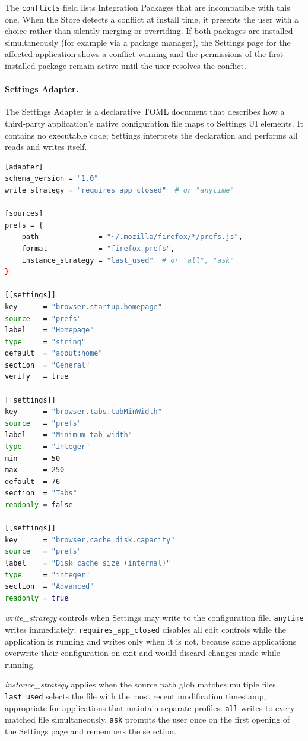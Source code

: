 The \texttt{conflicts} field lists Integration Packages that are incompatible
with this one. When the Store detects a conflict at install time, it presents
the user with a choice rather than silently merging or overriding. If both
packages are installed simultaneously (for example via a package manager), the
Settings page for the affected application shows a conflict warning and the
permissions of the first-installed package remain active until the user
resolves the conflict.

\paragraph{Settings Adapter.}
The Settings Adapter is a declarative TOML document that describes how a
third-party application's native configuration file maps to Settings UI
elements. It contains no executable code; Settings interprets the declaration
and performs all reads and writes itself.

\begin{lstlisting}[language=bash, caption={Settings Adapter declaration}]
[adapter]
schema_version = "1.0"
write_strategy = "requires_app_closed"  # or "anytime"

[sources]
prefs = {
    path              = "~/.mozilla/firefox/*/prefs.js",
    format            = "firefox-prefs",
    instance_strategy = "last_used"  # or "all", "ask"
}

[[settings]]
key      = "browser.startup.homepage"
source   = "prefs"
label    = "Homepage"
type     = "string"
default  = "about:home"
section  = "General"
verify   = true

[[settings]]
key      = "browser.tabs.tabMinWidth"
source   = "prefs"
label    = "Minimum tab width"
type     = "integer"
min      = 50
max      = 250
default  = 76
section  = "Tabs"
readonly = false

[[settings]]
key      = "browser.cache.disk.capacity"
source   = "prefs"
label    = "Disk cache size (internal)"
type     = "integer"
section  = "Advanced"
readonly = true
\end{lstlisting}

\emph{write\_strategy} controls when Settings may write to the configuration
file. \texttt{anytime} writes immediately; \texttt{requires\_app\_closed}
disables all edit controls while the application is running and writes only
when it is not, because some applications overwrite their configuration on
exit and would discard changes made while running.

\emph{instance\_strategy} applies when the source path glob matches multiple
files. \texttt{last\_used} selects the file with the most recent modification
timestamp, appropriate for applications that maintain separate profiles.
\texttt{all} writes to every matched file simultaneously. \texttt{ask}
prompts the user once on the first opening of the Settings page and remembers
the selection.

